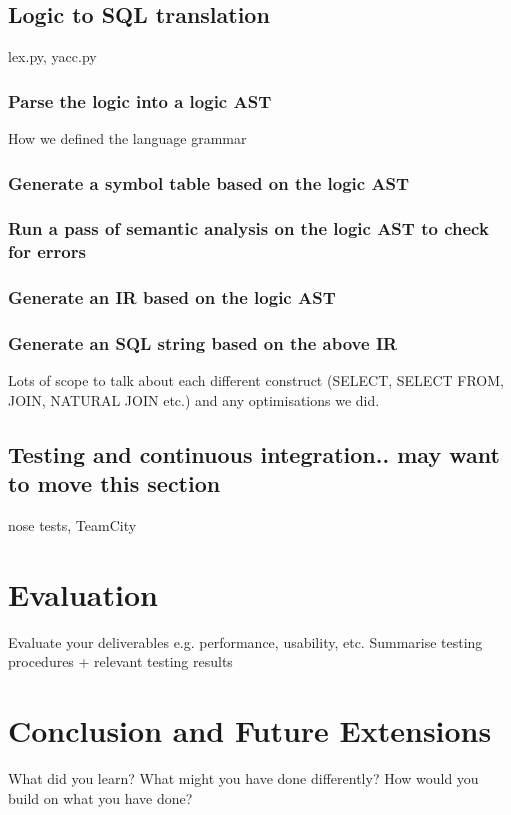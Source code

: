 \documentclass[a4paper, 11pt]{article}
\begin{document}
  \subsection{Logic to SQL translation}
    lex.py, yacc.py
    \subsubsection{Parse the logic into a logic AST}
      How we defined the language grammar

    \subsubsection{Generate a symbol table based on the logic AST}

    \subsubsection{Run a pass of semantic analysis on the logic AST to check for errors}

    \subsubsection{Generate an IR based on the logic AST}

    \subsubsection{Generate an SQL string based on the above IR}
      Lots of scope to talk about each different construct (SELECT, SELECT FROM, JOIN, NATURAL JOIN etc.) and any optimisations we did.

  \subsection{Testing and continuous integration.. may want to move this section}
    nose tests, TeamCity

\section{Evaluation}
  Evaluate your deliverables e.g. performance, usability, etc.
  Summarise testing procedures + relevant testing results

\section{Conclusion and Future Extensions}
  What did you learn? What might you have done differently?
  How would you build on what you have done?
\end{document}

